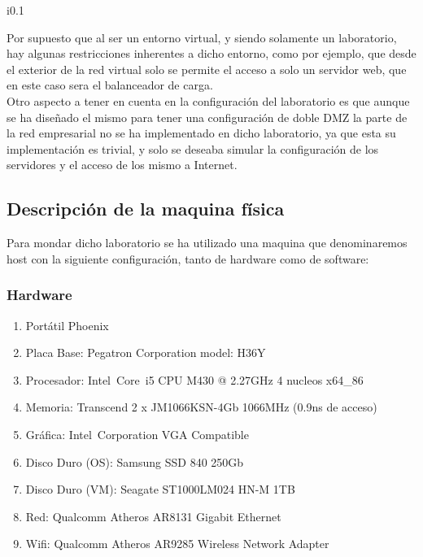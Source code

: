 \begin{wrapfigure}{i}{0.1\textwidth}
	\vspace{-25pt}
	\begin{center}
	\end{center}
	\vspace{-25pt}
\end{wrapfigure}

Por supuesto que al ser un entorno virtual, y siendo solamente un laboratorio, hay algunas restricciones inherentes a dicho entorno, como por ejemplo, que desde el exterior de la red virtual solo se permite el acceso a solo un servidor web, que en este caso sera el balanceador de carga.\\
Otro aspecto a tener en cuenta en la configuración del laboratorio es que aunque se ha diseñado el mismo para tener una configuración de doble DMZ la parte de la red empresarial no se ha implementado en dicho laboratorio, ya que esta su implementación es trivial, y solo se deseaba simular la configuración de los servidores y el acceso de los mismo a Internet.\\

\subsection{Descripción de la maquina física}
Para mondar dicho laboratorio se ha utilizado una maquina que denominaremos host con la siguiente configuración, tanto de hardware como de software:
\subsubsection{Hardware}
\begin{enumerate}
	\setlength\itemsep{1px} %
	\item Portátil Phoenix
	\item Placa Base: Pegatron Corporation model: H36Y
	\item Procesador: Intel\textregistered~Core\texttrademark~i5 CPU M430  @ 2.27GHz 4 nucleos x64\_86
	\item Memoria: Transcend 2 x JM1066KSN-4Gb 1066MHz (0.9ns de acceso)
	\item Gráfica: Intel\textregistered~Corporation VGA Compatible
	\item Disco Duro (OS): Samsung SSD 840 250Gb
	\item Disco Duro (VM): Seagate ST1000LM024 HN-M 1TB
	\item Red: Qualcomm Atheros AR8131 Gigabit Ethernet
	\item Wifi: Qualcomm Atheros  AR9285 Wireless Network Adapter
\end{enumerate}

